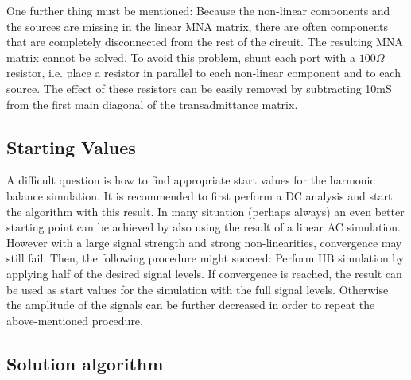 \addvspace{12pt}

One further thing must be mentioned: Because the non-linear
components and the sources are missing in the linear MNA matrix,
there are often components that are completely disconnected from
the rest of the circuit. The resulting MNA matrix cannot be
solved. To avoid this problem, shunt each port with a $100\Omega$
resistor, i.e. place a resistor in parallel to each non-linear
component and to each source. The effect of these resistors can
be easily removed by subtracting 10mS from the first main diagonal
of the transadmittance matrix.


\subsection{Starting Values}

A difficult question is how to find appropriate start values for the
harmonic balance simulation. It is recommended to first perform a DC
analysis and start the algorithm with this result. In many situation
(perhaps always) an even better starting point can be achieved by
also using the result of a linear AC simulation. However with a large
signal strength and strong non-linearities, convergence may still
fail. Then, the following procedure might succeed: Perform HB
simulation by applying half of the desired signal levels. If convergence
is reached, the result can be used as start values for the simulation
with the full signal levels. Otherwise the amplitude of the signals can
be further decreased in order to repeat the above-mentioned procedure.


\subsection{Solution algorithm}


